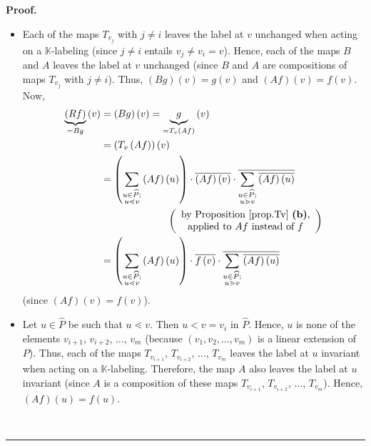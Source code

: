 \documentclass[numbers=enddot,12pt,final,onecolumn,notitlepage]{scrartcl}%
\theoremstyle{definition}
\newenvironment{verlong}{}{}
\newenvironment{proof}[1][Proof]{\noindent\textbf{#1.} }{\ \rule{0.5em}{0.5em}}
\let\sumnonlimits\sum
\renewcommand{\sum}{\sumnonlimits\limits}
\begin{document}
\begin{verlong}
\begin{proof}
\begin{itemize}
\item Each of the maps $T_{v_{j}}$ with $j\neq i$ leaves the label at $v$
unchanged when acting on a $\mathbb{K}$-labeling (since $j\neq i$ entails
$v_{j}\neq v_{i}=v$). Hence, each of the maps $B$ and $A$ leaves the label at
$v$ unchanged (since $B$ and $A$ are compositions of maps $T_{v_{j}}$ with
$j\neq i$). Thus, $\left(  Bg\right)  \left(  v\right)  =g\left(  v\right)  $
and $\left(  Af\right)  \left(  v\right)  =f\left(  v\right)  $. Now,%
\begin{align}
\underbrace{\left(  Rf\right)  }_{=Bg}\left(  v\right)   &  =\left(
Bg\right)  \left(  v\right)  =\underbrace{g}_{=T_{v}\left(  Af\right)
}\left(  v\right) \nonumber\\
&  =\left(  T_{v}\left(  Af\right)  \right)  \left(  v\right) \nonumber\\
&  =\left(  \sum\limits_{\substack{u\in\widehat{P};\\u\lessdot v}}\left(
Af\right)  \left(  u\right)  \right)  \cdot\overline{\left(  Af\right)
\left(  v\right)  }\cdot\overline{\sum\limits_{\substack{u\in\widehat{P}%
;\\u\gtrdot v}}\overline{\left(  Af\right)  \left(  u\right)  }}\nonumber\\
&  \ \ \ \ \ \ \ \ \ \ \ \ \ \ \ \ \ \ \ \ \left(
\begin{array}
[c]{c}%
\text{by Proposition \ref{prop.Tv} \textbf{(b)},}\\
\text{applied to }Af\text{ instead of }f
\end{array}
\right) \nonumber\\
&  =\left(  \sum\limits_{\substack{u\in\widehat{P};\\u\lessdot v}}\left(
Af\right)  \left(  u\right)  \right)  \cdot\overline{f\left(  v\right)  }%
\cdot\overline{\sum\limits_{\substack{u\in\widehat{P};\\u\gtrdot v}%
}\overline{\left(  Af\right)  \left(  u\right)  }} \label{pf.R.implicit.1}%
\end{align}
(since $\left(  Af\right)  \left(  v\right)  =f\left(  v\right)  $).

\item Let $u\in\widehat{P}$ be such that $u\lessdot v$. Then $u<v=v_{i}$ in
$\widehat{P}$. Hence, $u$ is none of the elements $v_{i+1}$, $v_{i+2}$,
$\ldots$, $v_{m}$ (because $\left(  v_{1},v_{2},\ldots,v_{m}\right)  $ is a
linear extension of $P$). Thus, each of the maps $T_{v_{i+1}}$, $T_{v_{i+2}}$,
$\ldots$, $T_{v_{m}}$ leaves the label at $u$ invariant when acting on a
$\mathbb{K}$-labeling. Therefore, the map $A$ also leaves the label at $u$
invariant (since $A$ is a composition of these maps $T_{v_{i+1}}$,
$T_{v_{i+2}}$, $\ldots$, $T_{v_{m}}$). Hence, $\left(  Af\right)  \left(
u\right)  =f\left(  u\right)  $.


\end{itemize}
\end{proof}
\end{verlong}
\end{document}
